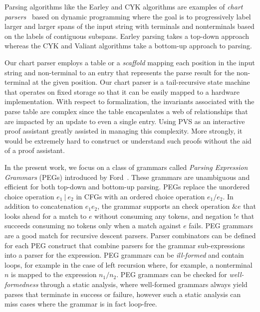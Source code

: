 \documentclass[sigplan,10pt,anonymous,review]{acmart}\settopmatter{printfolios=true,printccs=false,printacmref=false}
\begin{document}
\begin{CCSXML}
Parsing algorithms like the Earley and CYK algorithms are examples of \emph{chart
  parsers}~\cite{earley1970efficient,kay1986algorithm,pereira1983parsing}
based on dynamic programming where the goal is to
progressively label larger and larger spans of the input string with
terminals and nonterminals based on the labels of contiguous subspans.
Earley parsing takes a top-down approach whereas the CYK and Valiant
algorithms take a bottom-up approach to parsing.

Our chart parser employs a table or a \emph{scaffold} mapping each
position in the input string and non-terminal to an entry that
represents the parse result for the non-terminal at the given
position. Our chart parser is a tail-recursive state machine that
operates on fixed storage so that it can be easily mapped to a
hardware implementation. With respect to formalization, the invariants
associated with the parse table are complex since the table
encapsulates a web of relationships that are impacted by an update to
even a single entry. Using PVS as an interactive proof assistant
greatly assisted in managing this complexity.  More strongly, it 
would be extremely hard to construct or understand such proofs
without the aid of a proof assistant. 


In the present work, we focus on a class of grammars called \emph{Parsing
Expression Grammars} (PEGs) introduced by Ford~\cite{DBLP:conf/popl/Ford04}.  These grammars are
unambiguous and efficient for both top-down and bottom-up parsing.
PEGs replace the unordered choice operation $e_1 ~|~ e_2$ in CFGs with
an ordered choice operation $e_1/e_2$\@.  In addition to concatenation
$e_1 e_2$, the grammar supports an check operation $\& e$ that looks
ahead for a match to $e$ without consuming any tokens, and negation
$!e$ that succeeds consuming no tokens only when a match against $e$
fails.   PEG grammars are a good match for  recursive descent
parsers.  Parser combinators can be defined for each PEG construct that
combine parsers for the grammar sub-expressions into a parser for the
expression.  PEG grammars can be \emph{ill-formed} and contain loops, for
example in the case of left recursion where, for example, a
nonterminal $n$ is mapped to the expression $n_1/n_2$\@.  PEG grammars can
be checked for \emph{well-formedness} through a static analysis, where
well-formed grammars always yield parses that terminate in success or
failure, however such a static analysis can miss cases where the grammar
is in fact loop-free.  


\end{CCSXML}
\end{document}
